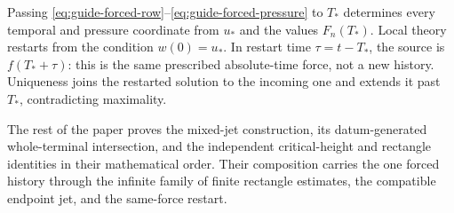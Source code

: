 Passing \eqref{eq:guide-forced-row}--\eqref{eq:guide-forced-pressure} to
\(T_*\) determines every temporal and pressure coordinate from \(u_*\) and
the values \(F_n(T_*)\).  Local theory restarts from the condition
\(w(0)=u_*\).  In restart time \(\tau=t-T_*\), the source is
\(f(T_*+\tau)\): this is the same prescribed absolute-time force, not a new
history.  Uniqueness joins the restarted solution to the incoming one and
extends it past \(T_*\), contradicting maximality.

The rest of the paper proves the mixed-jet construction, its datum-generated
whole-terminal intersection, and the independent critical-height and rectangle
identities in their mathematical order.  Their composition carries the one
forced history through the infinite family of finite rectangle estimates, the
compatible endpoint jet, and the same-force restart.
\label{guide:how-proof-ends}

